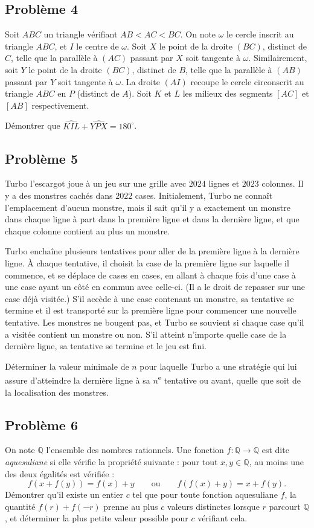 \subsection*{Problème 4}
Soit $ABC$ un triangle vérifiant $AB < AC < BC$. On note $\omega$ le cercle inscrit au triangle $ABC$, et
$I$ le centre de $\omega$. Soit $X$ le point de la droite $(BC)$, distinct de $C$, telle que la parallèle à
$(AC)$ passant par $X$ soit tangente à $\omega$. Similairement, soit $Y$ le point de la droite $(BC)$,
distinct de $B$, telle que la parallèle à $(AB)$ passant par $Y$ soit tangente à $\omega$. La droite $(AI)$
recoupe le cercle circonscrit au triangle $ABC$ en $P$ (distinct de $A$). Soit $K$ et $L$ les milieux des
segments $[AC]$ et $[AB]$ respectivement.

Démontrer que $\widehat{KIL} + \widehat{YPX} = 180^\circ$.

\subsection*{Problème 5}
Turbo l'escargot joue à un jeu sur une grille avec $2024$ lignes et $2023$ colonnes. Il y a des monstres
cachés dans $2022$ cases. Initialement, Turbo ne connaît l'emplacement d'aucun monstre, mais il sait qu'il
y a exactement un monstre dans chaque ligne à part dans la première ligne et dans la dernière ligne, et que
chaque colonne contient au plus un monstre.

Turbo enchaîne plusieurs tentatives pour aller de la première ligne à la dernière ligne. À chaque tentative,
il choisit la case de la première ligne sur laquelle il commence, et se déplace de cases en cases, en allant
à chaque fois d'une case à une case ayant un côté en commun avec celle-ci. (Il a le droit de repasser sur une
case déjà visitée.) S'il accède à une case contenant un monstre, sa tentative se termine et il est transporté
sur la première ligne pour commencer une nouvelle tentative. Les monstres ne bougent pas, et Turbo se
souvient si chaque case qu'il a visitée contient un monstre ou non. S'il atteint n'importe quelle case de la
dernière ligne, sa tentative se termine et le jeu est fini.

Déterminer la valeur minimale de $n$ pour laquelle Turbo a une stratégie qui lui assure d'atteindre la
dernière ligne à sa $n$\textsuperscript{e} tentative ou avant, quelle que soit de la localisation des monstres.

\subsection*{Problème 6}
On note $\mathbb{Q}$ l'ensemble des nombres rationnels. Une fonction $f \colon \mathbb{Q} \to \mathbb{Q}$ est
dite \emph{aquesuliane} si elle vérifie la propriété suivante : pour tout $x, y \in \mathbb{Q}$, au moins
une des deux égalités est vérifiée :
\[
f(x + f(y)) = f(x) + y \qquad \text{ou} \qquad f(f(x) + y) = x + f(y).
\]
Démontrer qu'il existe un entier $c$ tel que pour toute fonction aquesuliane $f$, la quantité
$f(r) + f(-r)$ prenne au plus $c$ valeurs distinctes lorsque $r$ parcourt $\mathbb{Q}$, et déterminer la
plus petite valeur possible pour $c$ vérifiant cela.
